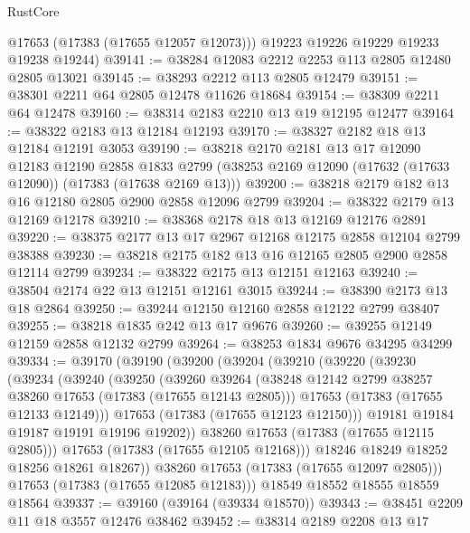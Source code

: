 \begin{lexlean}{RustCore}
\begin{coremodule}
        @17653
        (@17383 (@17655 @12057 @12073)))
      @19223
      @19226
      @19229
      @19233
      @19238
      @19244)
@39141 := @38284 @12083 @2212 @2253 @113 @2805 @12480 @2805 @13021
@39145 := @38293 @2212 @113 @2805 @12479
@39151 := @38301 @2211 @64 @2805 @12478 @11626 @18684
@39154 := @38309 @2211 @64 @12478
@39160 := @38314 @2183 @2210 @13 @19 @12195 @12477
@39164 := @38322 @2183 @13 @12184 @12193
@39170 := @38327 @2182 @18 @13 @12184 @12191 @3053
@39190 := @38218
    @2170
    @2181
    @13
    @17
    @12090
    @12183
    @12190
    @2858
    @1833
    @2799
    (@38253 @2169 @12090 (@17632 (@17633 @12090)) (@17383 (@17638 @2169 @13)))
@39200 := @38218 @2179 @182 @13 @16 @12180 @2805 @2900 @2858 @12096 @2799
@39204 := @38322 @2179 @13 @12169 @12178
@39210 := @38368 @2178 @18 @13 @12169 @12176 @2891
@39220 := @38375 @2177 @13 @17 @2967 @12168 @12175 @2858 @12104 @2799 @38388
@39230 := @38218 @2175 @182 @13 @16 @12165 @2805 @2900 @2858 @12114 @2799
@39234 := @38322 @2175 @13 @12151 @12163
@39240 := @38504 @2174 @22 @13 @12151 @12161 @3015
@39244 := @38390 @2173 @13 @18 @2864
@39250 := @39244 @12150 @12160 @2858 @12122 @2799 @38407
@39255 := @38218 @1835 @242 @13 @17 @9676
@39260 := @39255 @12149 @12159 @2858 @12132 @2799
@39264 := @38253 @1834 @9676 @34295 @34299
@39334 := @39170
    (@39190
      (@39200
        (@39204
          (@39210
            (@39220
              (@39230
                (@39234
                  (@39240
                    (@39250
                      (@39260
                        @39264
                        (@38248 @12142 @2799 @38257 @38260 @17653 (@17383 (@17655 @12143 @2805)))
                        @17653
                        (@17383 (@17655 @12133 @12149)))
                      @17653
                      (@17383 (@17655 @12123 @12150)))
                    @19181
                    @19184
                    @19187
                    @19191
                    @19196
                    @19202))
                @38260
                @17653
                (@17383 (@17655 @12115 @2805)))
              @17653
              (@17383 (@17655 @12105 @12168)))
            @18246
            @18249
            @18252
            @18256
            @18261
            @18267))
        @38260
        @17653
        (@17383 (@17655 @12097 @2805)))
      @17653
      (@17383 (@17655 @12085 @12183)))
    @18549
    @18552
    @18555
    @18559
    @18564
@39337 := @39160 (@39164 (@39334 @18570))
@39343 := @38451 @2209 @11 @18 @3557 @12476 @38462
@39452 := @38314
    @2189
    @2208
    @13
    @17

\end{coremodule}
\end{lexlean}
